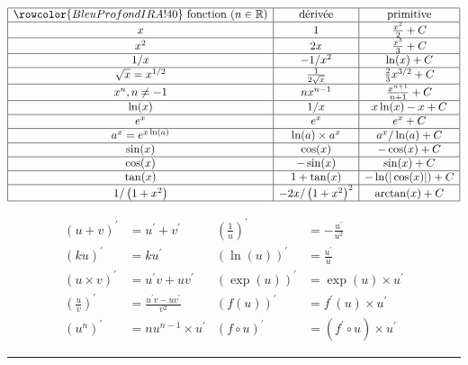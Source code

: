 \begin{f}
\renewcommand{\arraystretch}{1.5}
\[
\begin{array}{|c|c|c|}
\hline \rowcolor{BleuProfondIRA!40} \text { fonction }(n \in \mathbb{R}) & \text { dérivée } & \text { primitive } \\
\hline x & 1 & \frac{x^2}{2}+C \\
\hline x^2 & 2 x & \frac{x^3}{3}+C \\
\hline 1 / x & -1 / x^2 & \ln (x)+C \\
\hline \sqrt{x}=x^{1 / 2} & \frac{1}{2 \sqrt{x}} & \frac{2}{3} x^{3 / 2}+C \\
\hline x^n, n \neq-1 & n x^{n-1} & \frac{x^{n+1}}{n+1}+C \\
\hline \ln (x) & 1 / x & x \ln (x)-x+C \\
\hline e^x & e^x & e^x+C \\
\hline a^x=e^{x \ln (a)} & \ln (a) \times a^x & a^x / \ln (a)+C \\
\hline \sin (x) & \cos (x) & -\cos (x)+C \\
\hline \cos (x) & -\sin (x) & \sin (x)+C \\
\hline \tan (x) & 1+\tan (x) & -\ln (|\cos (x)|)+C \\
\hline 1 /\left(1+x^2\right) & -2 x /\left(1+x^2\right)^2 & \arctan (x)+C \\
\hline
\end{array}
\]
\renewcommand{\arraystretch}{1}

\[
    \begin{array}{rl|rl}
(u+v)^{\prime} & =u^{\prime}+v^{\prime} & \left(\frac{1}{u}\right)^{\prime} & =-\frac{u^{\prime}}{u^2} \\
(k u)^{\prime} & =k u^{\prime} & (\ln (u))^{\prime} & =\frac{u^{\prime}}{u} \\
(u \times v)^{\prime} & =u^{\prime} v+u v^{\prime} & (\exp (u))^{\prime} & =\exp (u) \times u^{\prime} \\
\left(\frac{u}{v}\right)^{\prime} & =\frac{u^{\prime} v-u v^{\prime}}{v^2} & (f(u))^{\prime} & =f^{\prime}(u) \times u^{\prime} \\
\left(u^n\right)^{\prime} & =n u^{n-1} \times u^{\prime} & (f \circ u)^{\prime} & =\left(f^{\prime} \circ u\right) \times u^{\prime}
\end{array}
\]
\end{f}

\hrule


